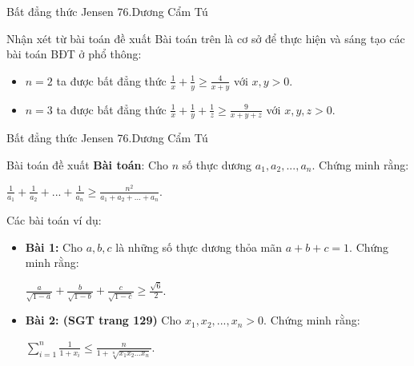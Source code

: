 \begin{frame}{{Bất đẳng thức Jensen} \hspace{6.5cm} 76.Dương Cẩm Tú} 
\begin{block}{Nhận xét từ bài toán đề xuất}
Bài toán trên là cơ sở để thực hiện và sáng tạo các bài toán BĐT ở phổ thông:\\
  \begin{itemize}
    \item $n=2$ ta được bất đẳng thức $\frac{1}{x}+\frac{1}{y}\geq \frac{4}{x+y}$ với $x,y>0$.
    \item $n=3$ ta được bất đẳng thức $\frac{1}{x}+\frac{1}{y}+\frac{1}{z}\geq \frac{9}{x+y+z}$ với $x,y,z>0$.
\end{itemize}
\end{block} 
\end{frame}
\begin{frame}{{Bất đẳng thức Jensen} \hspace{6.5cm} 76.Dương Cẩm Tú} 
\begin{block}{Bài toán đề xuất} 
 \textbf{Bài toán}: Cho $n$ số thực dương $a_1,a_2,...,a_n$. Chứng minh rằng:\\
\begin{center}
$\displaystyle\frac{1}{a_1}+\frac{1}{a_2}+...+\frac{1}{a_n}\geq \frac{n^2}{a_1+a_2+...+a_n}. $\\
\end{center}
\end{block} 
\vspace{0,25cm}
\pause
\begin{block}{Các bài toán ví dụ:}
  \begin{itemize}
    \item \textbf{Bài 1:} Cho $a,b,c$ là những số thực dương thỏa mãn $a+b+c=1$. Chứng minh rằng:\\
    \begin{center}
         $\displaystyle\frac{a}{\sqrt{1-a}}+\frac{b}{\sqrt{1-b}}+\frac{c}{\sqrt{1-c}}\geq \frac{\sqrt{6}}{2}$.
    \end{center}
    \pause
    \item \textbf{Bài 2: (SGT trang 129)} Cho $x_1,x_2,...,x_n>0$. Chứng minh rằng:\\
    \begin{center}
          $\displaystyle \sum_{i=1}^{n} \frac{1}{1+x_i}\leq \frac{n}{1+\sqrt[n]{x_1x_2...x_n}}$.  
    \end{center}
\end{itemize}
\end{block} 
\end{frame}
